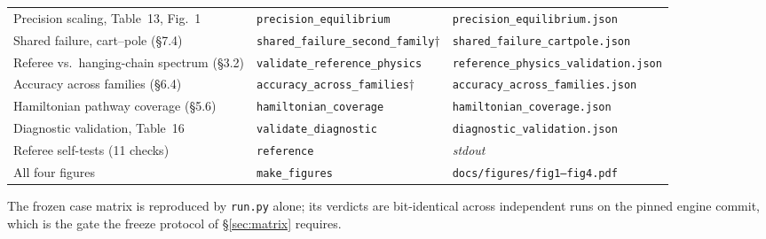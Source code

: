 \documentclass[review,12pt]{elsarticle}
\begin{document}
{\begin{longtable}{@{}L{0.30\textwidth}L{0.31\textwidth}L{0.31\textwidth}@{}}
Precision scaling, Table~13, Fig.~1 & \texttt{precision\_\allowbreak equilibrium} & \texttt{precision\_\allowbreak equilibrium.json} \\
Shared failure, cart--pole ({\S}7.4) & \texttt{shared\_\allowbreak failure\_\allowbreak second\_\allowbreak family}$\dagger$ & \texttt{shared\_\allowbreak failure\_\allowbreak cartpole.json} \\
Referee vs.\ hanging-chain spectrum ({\S}3.2) & \texttt{validate\_\allowbreak reference\_\allowbreak physics} & \texttt{reference\_\allowbreak physics\_\allowbreak validation.json} \\
Accuracy across families ({\S}6.4) & \texttt{accuracy\_\allowbreak across\_\allowbreak families}$\dagger$ & \texttt{accuracy\_\allowbreak across\_\allowbreak families.json} \\
Hamiltonian pathway coverage ({\S}5.6) & \texttt{hamiltonian\_\allowbreak coverage} & \texttt{hamiltonian\_\allowbreak coverage.json} \\
Diagnostic validation, Table~16 & \texttt{validate\_\allowbreak diagnostic} & \texttt{diagnostic\_\allowbreak validation.json} \\
Referee self-tests (11 checks) & \texttt{reference} & \emph{stdout} \\
All four figures & \texttt{make\_\allowbreak figures} & \texttt{docs/\allowbreak figures/\allowbreak fig1--fig4.pdf} \\
\end{longtable}
}


The frozen case matrix is reproduced by \texttt{run.py} alone; its verdicts are
bit-identical across independent runs on the pinned engine commit, which is the
gate the freeze protocol of \S\ref{sec:matrix} requires.
\end{document}
